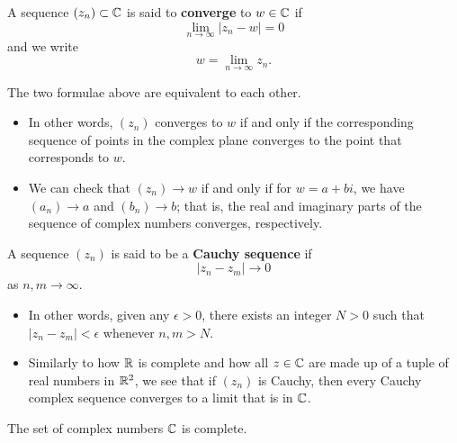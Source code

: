 \documentclass[11pt,a4paper]{book}
\begin{document}
\begin{definition}[Convergence in \( \C \)]
    A sequence \( ({z}_{n}) \subset \mathbb{C} \) is said to \textbf{converge} to \( w \in \mathbb{C}  \) if 
    \[ \lim_{ n \to \infty  }  | {z}_{n} - w  | = 0   \]
    and we write
    \[  w = \lim_{ n \to  \infty  } {z}_{n}. \]
\end{definition}
The two formulae above are equivalent to each other.

\begin{itemize}
    \item In other words, \( ({z}_{n})  \) converges to \( w  \) if and only if the corresponding sequence of points in the complex plane converges to the point that corresponds to \( w \). 
    \item We can check that \( ({z}_{n}) \to w  \) if and only if for \( w = a + bi  \), we have \( ({a}_{n}) \to a  \) and \( ({b}_{n}) \to b  \); that is, the real and imaginary parts of the sequence of complex numbers converges, respectively.
\end{itemize}

\begin{definition}
    A sequence \( ({z}_{n})  \) is said to be a \textbf{Cauchy sequence} if 
    \[  | {z}_{n} - {z}_{m} |  \to 0  \]
    as \( n,m \to \infty  \).
\end{definition}

\begin{itemize}
    \item In other words, given any \( \epsilon > 0  \), there exists an integer \( N > 0  \) such that \( | {z}_{n} - {z}_{m} | < \epsilon  \) whenever \( n,m > N  \).
    \item Similarly to how \( \mathbb{R}  \) is complete and how all \( z \in \mathbb{C}   \) are made up of a tuple of real numbers in \( \mathbb{R}^{2} \), we see that if \( ({z}_{n}) \) is Cauchy, then every Cauchy complex sequence converges to a limit that is in \( \C  \).
\end{itemize}

\begin{theorem}[ ]
    The set of complex numbers \( \C  \) is complete.
\end{theorem}
\end{document}
